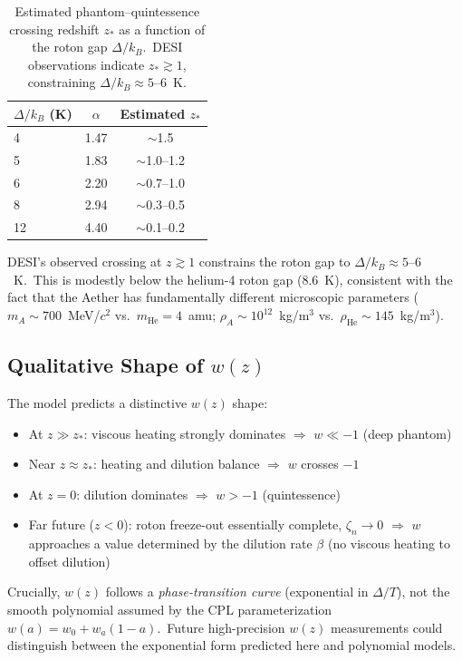 \documentclass[12pt,letterpaper]{article}
\newcommand{\rhoa}{\rho_{\!A}}
\begin{document}
\begin{table}[h]
\centering
\begin{tabular}{@{}lcc@{}}
\toprule
$\Delta/k_B$ (K) & $\alpha$ & Estimated $z_*$ \\
\midrule
4  & 1.47 & $\sim$1.5 \\
5  & 1.83 & $\sim$1.0--1.2 \\
6  & 2.20 & $\sim$0.7--1.0 \\
8  & 2.94 & $\sim$0.3--0.5 \\
12 & 4.40 & $\sim$0.1--0.2 \\
\bottomrule
\end{tabular}
\caption{Estimated phantom--quintessence crossing redshift $z_*$ as a function
  of the roton gap $\Delta/k_B$.\ DESI observations indicate $z_* \gtrsim 1$,
  constraining $\Delta/k_B \approx 5$--$6$~K.}
\label{tab:crossing}
\end{table}

DESI's observed crossing at $z \gtrsim 1$ constrains the roton gap to
$\Delta/k_B \approx 5$--$6$~K.\ This is modestly below the helium-4 roton gap
($8.6$~K), consistent with the fact that the Aether has fundamentally different
microscopic parameters ($m_A \sim 700$~MeV/$c^2$ vs.\ $m_{\mathrm{He}} =
4$~amu; $\rhoa \sim 10^{12}$~kg/m$^3$ vs.\ $\rho_{\mathrm{He}} \sim 145$~kg/m$^3$).


\subsection{Qualitative Shape of \texorpdfstring{$w(z)$}{w(z)}}

The model predicts a distinctive $w(z)$ shape:

\begin{itemize}[leftmargin=2em]
  \item At $z \gg z_*$: viscous heating strongly dominates $\Rightarrow$
    $w \ll -1$ (deep phantom)
  \item Near $z \approx z_*$: heating and dilution balance $\Rightarrow$
    $w$ crosses $-1$
  \item At $z = 0$: dilution dominates $\Rightarrow$ $w > -1$ (quintessence)
  \item Far future ($z < 0$): roton freeze-out essentially complete,
    $\zeta_n \to 0$ $\Rightarrow$ $w$ approaches a value determined by the
    dilution rate $\beta$ (no viscous heating to offset dilution)
\end{itemize}

Crucially, $w(z)$ follows a \emph{phase-transition curve} (exponential in
$\Delta/T$), not the smooth polynomial assumed by the CPL parameterization
$w(a) = w_0 + w_a(1-a)$.\ Future high-precision $w(z)$ measurements could
distinguish between the exponential form predicted here and polynomial models.
\end{document}
